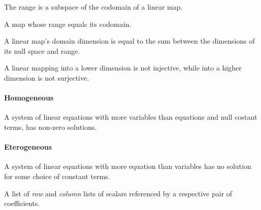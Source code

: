 \begin{multicols}{3}
  The range is a subspace of the codomain of a linear map.

  A map whose range equals its codomain.

  A linear map's domain dimension is equal to the sum between the dimensions of its null space and range.

  A linear mapping into a lower dimension is not injective, while into a higher dimension is not surjective.

  \paragraph{\textbf{Homogeneous}}
  A system of linear equations with more variables than equations and null costant terms, has non-zero solutions.
  
  \paragraph{\textbf{Eterogeneous}}
  A system of linear equations with more equation than variables has no solution for some choice of constant terms.
  
  A list of \textit{row} and \textit{column} lists of scalars referenced by a respective pair of coefficients.
  

\end{multicols}
